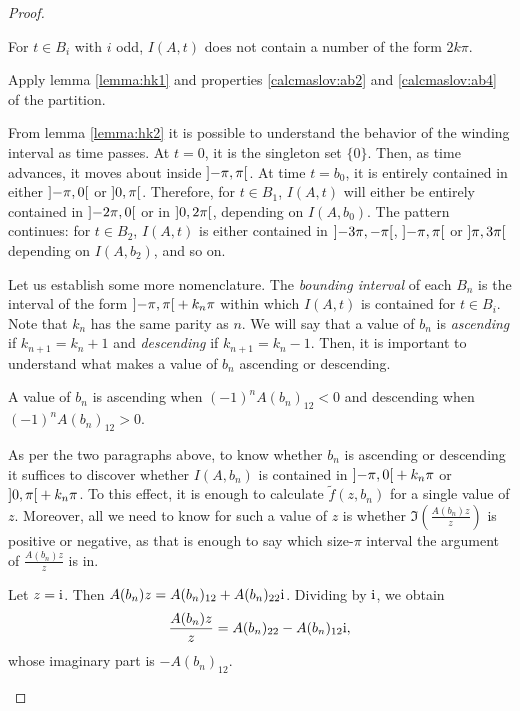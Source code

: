 \begin{proof}
\begin{lemma}
For $t \in B_i$ with $i$ odd, $I(A,t)$ does not contain a number of the form $2k\pi$.
\end{lemma}

\begin{lemmaproof}
Apply lemma \ref{lemma:hk1} and properties \ref{calcmaslov:ab2} and \ref{calcmaslov:ab4} of the partition.
\end{lemmaproof}

From lemma \ref{lemma:hk2} it is possible to understand the behavior of the winding interval as time passes. At $t = 0$, it is the singleton set $\{0\}$. Then, as time advances, it moves about inside $\ointerval{-\pi}\pi$. At time $t = b_0$, it is entirely contained in either $\ointerval{-\pi}0$ or $\ointerval0\pi$. Therefore, for $t \in B_1$, $I(A,t)$ will either be entirely contained in $\ointerval{-2\pi}0$ or in $\ointerval0{2\pi}$, depending on $I(A,b_0)$. The pattern continues: for $t \in B_2$, $I(A,t)$ is either contained in $\ointerval{-3\pi}{-\pi}$, $\ointerval{-\pi}{\pi}$ or $\ointerval{\pi}{3\pi}$ depending on $I(A,b_2)$, and so on.

Let us establish some more nomenclature. The \emph{bounding interval} of each $B_n$ is the interval of the form $\ointerval{-\pi}\pi + k_n \pi$ within which $I(A,t)$ is contained for $t \in B_i$. Note that $k_n$ has the same parity as $n$. We will say that a value of $b_n$ is \emph{ascending} if $k_{n+1} = k_n + 1$ and \emph{descending} if $k_{n+1} = k_n - 1$. Then, it is important to understand what makes a value of $b_n$ ascending or descending.

\begin{lemma}\label{lemma:hk3}
A value of $b_n$ is ascending when $(-1)^n A(b_n)_{12} < 0$ and descending when $(-1)^n A(b_n)_{12} > 0$.
\end{lemma}

\begin{lemmaproof}
As per the two paragraphs above, to know whether $b_n$ is ascending or descending it suffices to discover whether $I(A,b_n)$ is contained in $\ointerval{-\pi}0 + k_n \pi$ or $\ointerval0\pi + k_n \pi$. To this effect, it is enough to calculate $\tilde f(z,b_n)$ for a single value of $z$. Moreover, all we need to know for such a value of $z$ is whether $\Im\left(\frac{A(b_n) z}z\right)$ is positive or negative, as that is enough to say which size-$\pi$ interval the argument of $\frac{A(b_n) z}z$ is in.

Let $z = \mathrm{i}$. Then $A(b_n)z = A(b_n)_{12} + A(b_n)_{22} \mathrm{i}$. Dividing by $\mathrm{i}$, we obtain
\begin{equation}
\frac{A(b_n)z}z = A(b_n)_{22} - A(b_n)_{12} \mathrm{i},
\end{equation}
whose imaginary part is $-A(b_n)_{12}$.


\end{lemmaproof}
\end{proof}
